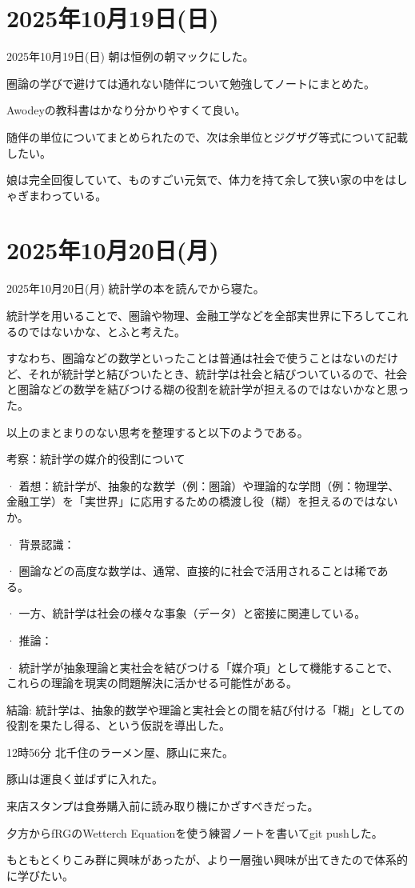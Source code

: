 \documentclass[dvipdfmx, autodetect-engine, aspectratio=169, 10.5pt]{beamer}
\begin{document}
\section{2025年10月19日(日)}

\begin{frame}{2025年10月19日(日)}
朝は恒例の朝マックにした。

圏論の学びで避けては通れない随伴について勉強してノートにまとめた。

Awodeyの教科書はかなり分かりやすくて良い。

随伴の単位についてまとめられたので、次は余単位とジグザグ等式について記載したい。

娘は完全回復していて、ものすごい元気で、体力を持て余して狭い家の中をはしゃぎまわっている。
\end{frame}

\section{2025年10月20日(月)}

\begin{frame}{2025年10月20日(月)}
\scriptsize
統計学の本を読んでから寝た。

統計学を用いることで、圏論や物理、金融工学などを全部実世界に下ろしてこれるのではないかな、とふと考えた。

すなわち、圏論などの数学といったことは普通は社会で使うことはないのだけど、それが統計学と結びついたとき、統計学は社会と結びついているので、社会と圏論などの数学を結びつける糊の役割を統計学が担えるのではないかなと思った。

以上のまとまりのない思考を整理すると以下のようである。

考察：統計学の媒介的役割について

· 着想：統計学が、抽象的な数学（例：圏論）や理論的な学問（例：物理学、金融工学）を「実世界」に応用するための橋渡し役（糊）を担えるのではないか。

· 背景認識：

· 圏論などの高度な数学は、通常、直接的に社会で活用されることは稀である。

· 一方、統計学は社会の様々な事象（データ）と密接に関連している。

· 推論：

· 統計学が抽象理論と実社会を結びつける「媒介項」として機能することで、これらの理論を現実の問題解決に活かせる可能性がある。

結論:
統計学は、抽象的数学や理論と実社会との間を結び付ける「糊」としての役割を果たし得る、という仮説を導出した。

12時56分
北千住のラーメン屋、豚山に来た。

豚山は運良く並ばずに入れた。

来店スタンプは食券購入前に読み取り機にかざすべきだった。

夕方からfRGのWetterch Equationを使う練習ノートを書いてgit pushした。

もともとくりこみ群に興味があったが、より一層強い興味が出てきたので体系的に学びたい。
\end{frame}
\end{document}
